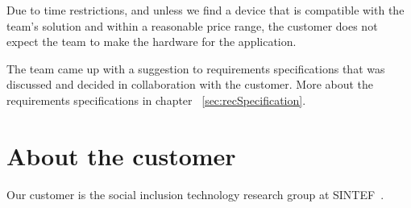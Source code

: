 Due to time restrictions, and unless we find a device that is compatible with the team's solution and within a reasonable price range, the customer does not expect the team to make the hardware for the application.

The team came up with a suggestion to requirements specifications that was discussed and decided in collaboration with the customer. More about the requirements specifications in chapter ~\ref{sec:recSpecification}.

\section{About the customer}

Our customer is the social inclusion technology research group at SINTEF~\cite{sintef}.



